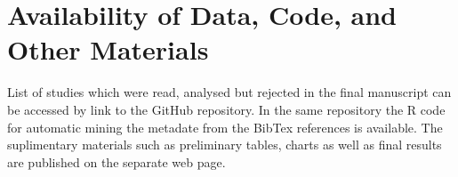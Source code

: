 \section{Availability of Data, Code, and Other Materials}
    List of studies which were read, analysed but rejected in the final manuscript can be accessed by link to the GitHub repository. In the same repository the R code for automatic mining the metadate from the BibTex references is available. The suplimentary materials such as preliminary tables, charts as well as final results are published on the separate web page.